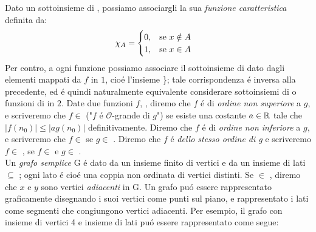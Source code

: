 Dato un sottoinsieme  di , possiamo associargli la sua \textit{funzione caratteristica}  definita da:
\begin{equation}
    \chi_A = 
    \begin{cases}
        0, \hspace{3mm} \textnormal{se } x \notin A \\
        1, \hspace{3mm} \textnormal{se } x \in A \\
    \end{cases}
\end{equation}
Per contro, a ogni funzione  possiamo associare il sottoinsieme di  dato dagli elementi mappati da $f$ in $1$, cioé l'insieme \}; tale corrispondenza é inversa alla precedente, ed é quindi naturalmente equivalente considerare sottoinsiemi di  o funzioni di  in $2$.
Date due funzioni $f$, , diremo che $f$ é di \textit{ordine non superiore} a $g$, e scriveremo che $f \in$  ("$f$ é $\mathcal{O}$-grande di $g$") se esiste una costante $a \in \mathbb{R}$ tale che $|f(n_0)| \leq |a g(n_0)|$ definitivamente. Diremo che $f$ é di \textit{ordine non inferiore} a $g$, e scriveremo che $f \in$  se $g \in$ . Diremo che $f$ é \textit{dello stesso ordine di g} e scriveremo $f \in$ , se $f \in$  e $g \in$ .\\
Un \textit{grafo semplice} G é dato da un insieme finito di vertici  e da un insieme di lati  $\subseteq$ ; ogni lato é cioé una coppia non ordinata di vertici distinti. Se  $\in$ , diremo che $x$ e $y$ sono vertici \textit{adiacenti} in G. Un grafo puó essere rappresentato graficamente disegnando i suoi vertici come punti sul piano, e rappresentato i lati come segmenti che congiungono vertici adiacenti. Per esempio, il grafo con insieme di vertici 4 e insieme di lati   puó essere rappresentato come segue:\\


